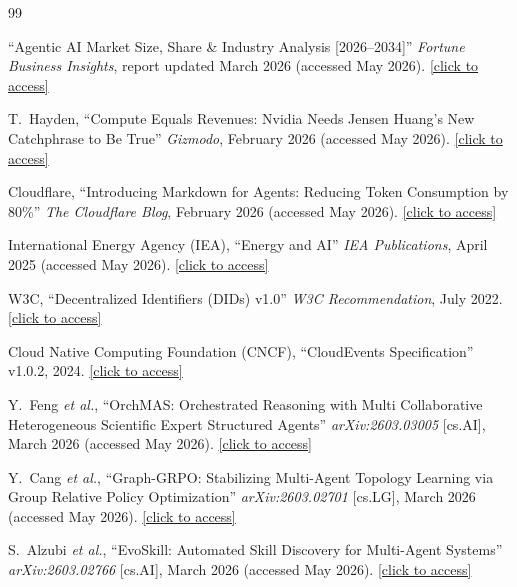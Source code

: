 \documentclass[12pt,a4paper]{article}
\begin{document}
\begin{thebibliography}{99}

``Agentic AI Market Size, Share \& Industry Analysis [2026--2034]'' \textit{Fortune Business Insights}, report updated March 2026 (accessed May 2026). \href{https://www.fortunebusinessinsights.com/agentic-ai-market-114233}{[click to access]}

T.~Hayden, ``Compute Equals Revenues: Nvidia Needs Jensen Huang's New Catchphrase to Be True'' \textit{Gizmodo}, February 2026 (accessed May 2026). \href{https://gizmodo.com/compute-equals-revenues-nvidia-needs-jensen-huangs-new-catchphrase-to-be-true-2000726841}{[click to access]}

Cloudflare, ``Introducing Markdown for Agents: Reducing Token Consumption by 80\%'' \textit{The Cloudflare Blog}, February 2026 (accessed May 2026). \href{https://blog.cloudflare.com/markdown-for-agents}{[click to access]}

International Energy Agency (IEA), ``Energy and AI'' \textit{IEA Publications}, April 2025 (accessed May 2026). \href{https://www.iea.org/reports/energy-and-ai}{[click to access]}

W3C, ``Decentralized Identifiers (DIDs) v1.0'' \textit{W3C Recommendation}, July 2022. \href{https://www.w3.org/TR/did-core/}{[click to access]}

Cloud Native Computing Foundation (CNCF), ``CloudEvents Specification'' v1.0.2, 2024. \href{https://cloudevents.io/}{[click to access]}

Y.~Feng \textit{et al.}, ``OrchMAS: Orchestrated Reasoning with Multi Collaborative Heterogeneous Scientific Expert Structured Agents'' \textit{arXiv:2603.03005} [cs.AI], March 2026 (accessed May 2026). \href{https://arxiv.org/abs/2603.03005}{[click to access]}

Y.~Cang \textit{et al.}, ``Graph-GRPO: Stabilizing Multi-Agent Topology Learning via Group Relative Policy Optimization'' \textit{arXiv:2603.02701} [cs.LG], March 2026 (accessed May 2026). \href{https://arxiv.org/abs/2603.02701}{[click to access]}

S.~Alzubi \textit{et al.}, ``EvoSkill: Automated Skill Discovery for Multi-Agent Systems'' \textit{arXiv:2603.02766} [cs.AI], March 2026 (accessed May 2026). \href{https://arxiv.org/abs/2603.02766}{[click to access]}


\end{thebibliography}
\end{document}
